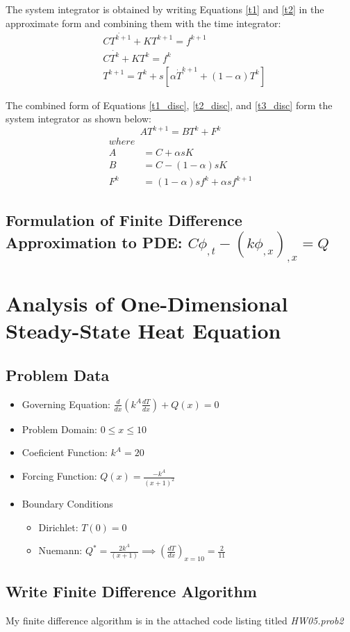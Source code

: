\documentclass[letterpaper, 10pt, oneside]{article}
\newcommand{\be}{\begin{equation}}
\newcommand{\ee}{\end{equation}}
\newcommand{\as}[1]{\begin{align*}#1\end{align*}}
\newcommand{\an}[1]{\begin{align}#1\end{align}}
\newcommand{\bi}{\begin{itemize}}
\newcommand{\ei}{\end{itemize}}
\begin{document}
The system integrator is obtained by writing Equations \ref{t1} and \ref{t2} in the approximate form and combining them with the time integrator:
\an{ &C\dot{T^{k+1}} + KT^{k+1} = f^{k+1} \label{t1_disc} \\
	&C\dot{T^{k}} + KT^{k} = f^{k} \label{t2_disc}\\
	&T^{k+1}= T^k + s\left[\alpha \dot{T}^{k+1} + (1-\alpha)T^k\right] \label{t3_disc} }

The combined form of Equations \ref{t1_disc}, \ref{t2_disc}, and \ref{t3_disc} form the system integrator as shown below:
\be AT^{k+1} = BT^{k} + F^k \ee
\as{where&\\
	A &= C + \alpha s K\\
	B &= C - (1 - \alpha)sK\\
	F^k & = (1 - \alpha)sf^k + \alpha s f^{k+1}}

\subsection{Formulation of Finite Difference Approximation to PDE: $C\phi_{,t}-(k\phi_{,x})_{,x} =Q$}



\section{Analysis of One-Dimensional Steady-State Heat Equation}
\subsection{Problem Data}
\bi
	\item Governing Equation: $\frac{d}{dx}\left(k^A \frac{dT}{dx}\right) + Q(x) = 0$
	\item Problem Domain: $ 0\le x \le 10 $
	\item Coeficient Function: $ k^A = 20 $
	\item Forcing Function: $ Q(x) =  \frac{-k^A}{(x+1)^2}$
	\item Boundary Conditions
	\bi
		\item Dirichlet: $T(0) = 0$
		\item Nuemann: $Q^* = \frac{2k^A}{(x+1)} \implies \left(\frac{dT}{dx} \right)_{x=10} =  \frac{2}{11}$
	\ei
\ei

\subsection{Write Finite Difference Algorithm}
My finite difference algorithm is in the attached code listing titled \emph{HW05.prob2}
\end{document}

